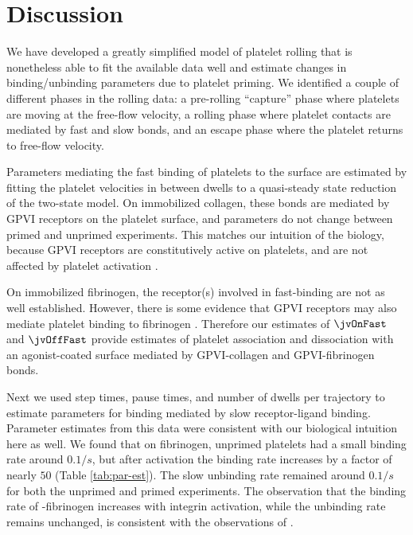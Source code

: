 \section{Discussion}
\label{sec:discussion-jv}

We have developed a greatly simplified model of platelet rolling that
is nonetheless able to fit the available data well and estimate
changes in binding/unbinding parameters due to platelet
priming. We identified a couple of different phases in the rolling
data: a pre-rolling ``capture'' phase where platelets are moving at
the free-flow velocity, a rolling phase where platelet contacts are
mediated by fast and slow bonds, and an escape phase where the
platelet returns to free-flow velocity.

Parameters mediating the fast binding of platelets to the surface are
estimated by fitting the platelet velocities in between dwells to a
quasi-steady state reduction of the two-state model. On immobilized
collagen, these bonds are mediated by GPVI receptors on the platelet
surface, and parameters do not change between primed and unprimed
experiments. This matches our intuition of the biology, because GPVI
receptors are constitutively active on platelets, and are not affected
by platelet activation .

On immobilized fibrinogen, the receptor(s) involved in fast-binding
are not as well established. However, there is some evidence that GPVI
receptors may also mediate platelet binding to fibrinogen
\cite{Mangin2018}. Therefore our estimates of $\jvOnFast$ and
$\jvOffFast$ provide estimates of platelet association and
dissociation with an agonist-coated surface mediated by GPVI-collagen
and GPVI-fibrinogen bonds.

Next we used step times, pause times, and number of dwells per
trajectory to estimate parameters for binding mediated by slow
receptor-ligand binding. Parameter estimates from this data were
consistent with our biological intuition here as well. We found that
on fibrinogen, unprimed platelets had a small binding rate around
$0.1 /s$, but after activation the binding rate increases by a factor
of nearly $50$ (Table \ref{tab:par-est}). The slow unbinding rate
remained around $0.1 /s$ for both the unprimed and primed
experiments. The observation that the binding rate of
-fibrinogen increases with integrin activation, while
the unbinding rate remains unchanged, is consistent with the
observations of \cite{Litvinov2012}.

